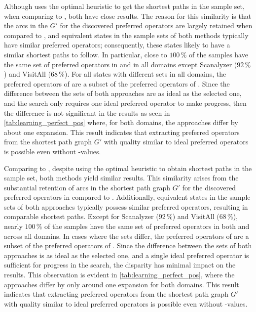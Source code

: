 \documentclass[ppgc,diss,english]{iiufrgs}
\begin{document}
Although \pogstar uses the optimal heuristic \hstar to get the shortest paths in the sample set, when comparing to \pog, both have close results. The reason for this similarity is that the arcs in the $G'$ for the discovered preferred operators \pog are largely retained when compared to \pogstar, and equivalent states in the sample sets of both methods typically have similar preferred operators; consequently, these states likely to have a similar shortest paths to follow. In particular, close to $100\,\%$ of the samples have the same set of preferred operators in \pogstar and \pog in all domains except Scanalyzer ($92\,\%$) and VisitAll ($68\,\%$). For all states with different sets in all domains, the preferred operators of \pog are a subset of the preferred operators of \pogstar. Since the difference between the sets of both approaches are as ideal as the selected one, and the search only requires one ideal preferred operator to make progress, then the difference is not significant in the results as seen in \cref{tab:learning_perfect_pos} where, for both domains, the approaches differ by about one expansion. This result indicates that extracting preferred operators from the shortest path graph $G'$ with quality similar to ideal preferred operators is possible even without \hstar-values.

Comparing \pogstar to \pog, despite \pogstar using the optimal heuristic \hstar to obtain shortest paths in the sample set, both methods yield similar results. This similarity arises from the substantial retention of arcs in the shortest path graph $G'$ for the discovered preferred operators in \pog compared to \pogstar. Additionally, equivalent states in the sample sets of both approaches typically possess similar preferred operators, resulting in comparable shortest paths. Except for Scanalyzer ($92\,\%$) and VisitAll ($68\,\%$), nearly $100\,\%$ of the samples have the same set of preferred operators in both \pogstar and \pog across all domains. In cases where the sets differ, the preferred operators of \pog are a subset of the preferred operators of \pogstar. Since the difference between the sets of both approaches is as ideal as the selected one, and a single ideal preferred operator is sufficient for progress in the search, the disparity has minimal impact on the results. This observation is evident in \cref{tab:learning_perfect_pos}, where the approaches differ by only around one expansion for both domains. This result indicates that extracting preferred operators from the shortest path graph $G'$ with quality similar to ideal preferred operators is possible even without \hstar-values.
\end{document}
